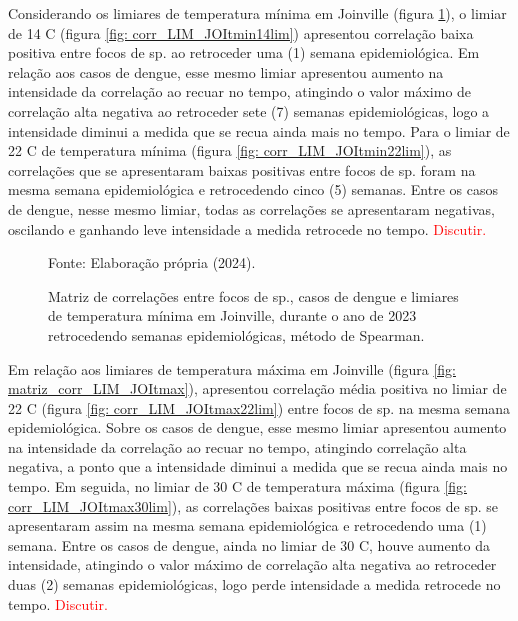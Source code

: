 \documentclass[
	12pt,				%
	openright,			%
	oneside,			%
	a4paper,			%
	english,			%
	french,				%
	spanish,			%
	brazil				%
	dvipsnames, table]{abntex2}
\begin{document}
\indent Considerando os limiares de temperatura mínima em Joinville (figura \ref{fig: matriz_corr_LIM_JOItmin}), o limiar de 14 C (figura \ref{fig: corr_LIM_JOItmin14lim}) apresentou correlação baixa positiva entre focos de  sp. ao retroceder uma (1) semana epidemiológica. Em relação aos casos de dengue, esse mesmo limiar apresentou aumento na intensidade da correlação ao recuar no tempo, atingindo o valor máximo de correlação alta negativa ao retroceder sete (7) semanas epidemiológicas, logo a intensidade diminui a medida que se recua ainda mais no tempo. Para o limiar de 22 C de temperatura mínima (figura \ref{fig: corr_LIM_JOItmin22lim}), as correlações que se apresentaram baixas positivas entre focos de  sp. foram na mesma semana epidemiológica e retrocedendo cinco (5) semanas. Entre os casos de dengue, nesse mesmo limiar, todas as correlações se apresentaram negativas, oscilando e ganhando leve intensidade a medida retrocede no tempo. \textcolor{red}{Discutir.}

\begin{figure}[htbp]
    \begin{center}
    \caption{Matriz de correlações entre focos de  sp., casos de dengue e limiares de temperatura mínima em Joinville, durante o ano de 2023 retrocedendo semanas epidemiológicas, método de Spearman.}
    \label{fig: matriz_corr_LIM_JOItmin}
        \hfill
    \end{center}
    \small{Fonte: Elaboração própria (2024).}
\end{figure}

\indent Em relação aos limiares de temperatura máxima em Joinville (figura \ref{fig: matriz_corr_LIM_JOItmax}), apresentou correlação média positiva no limiar de 22 C (figura \ref{fig: corr_LIM_JOItmax22lim}) entre focos de  sp. na mesma semana epidemiológica. Sobre os casos de dengue, esse mesmo limiar apresentou aumento na intensidade da correlação ao recuar no tempo, atingindo correlação alta negativa, a ponto que a intensidade diminui a medida que se recua ainda mais no tempo. Em seguida, no limiar de 30 C de temperatura máxima (figura \ref{fig: corr_LIM_JOItmax30lim}), as correlações baixas positivas entre focos de  sp. se apresentaram assim na mesma semana epidemiológica e retrocedendo uma (1) semana. Entre os casos de dengue, ainda no limiar de 30 C, houve aumento da intensidade, atingindo o valor máximo de correlação alta negativa ao retroceder duas (2) semanas epidemiológicas, logo perde intensidade a medida retrocede no tempo. \textcolor{red}{Discutir.}
\end{document}

